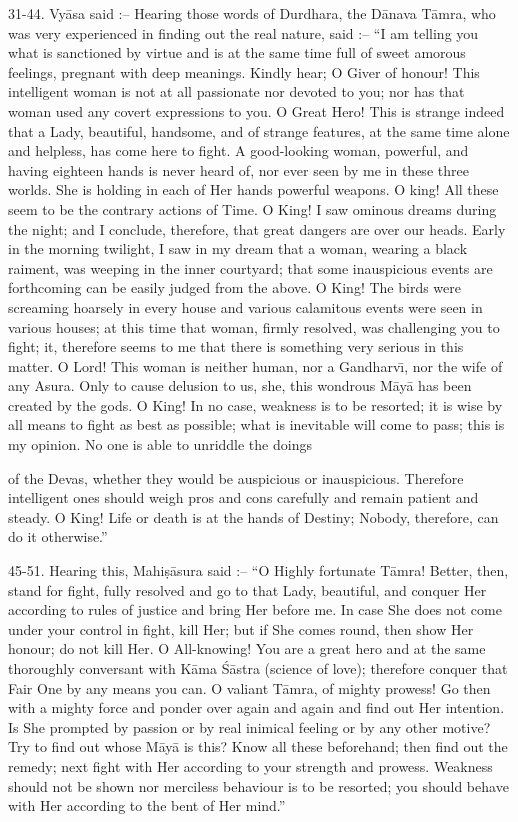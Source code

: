 31-44. Vy\=asa said :-- Hearing those words of Durdhara, the D\=anava T\=amra, who was very experienced in finding out the real nature, said :-- ``I am telling you what is sanctioned by virtue and is at the same time full of sweet amorous feelings, pregnant with deep meanings. Kindly hear; O Giver of honour! This intelligent woman is not at all passionate nor devoted to you; nor has that woman used any covert expressions to you. O Great Hero! This is strange indeed that a Lady, beautiful, handsome, and of strange features, at the same time alone and helpless, has come here to fight. A good-looking woman, powerful, and having eighteen hands is never heard of, nor ever seen by me in these three worlds. She is holding in each of Her hands powerful weapons. O king! All these seem to be the contrary actions of Time. O King! I saw ominous dreams during the night; and I conclude, therefore, that great dangers are over our heads. Early in the morning twilight, I saw in my dream that a woman, wearing a black raiment, was weeping in the inner courtyard; that some inauspicious events are forthcoming can be easily judged from the above. O King! The birds were screaming hoarsely in every house and various calamitous events were seen in various houses; at this time that woman, firmly resolved, was challenging you to fight; it, therefore seems to me that there is something very serious in this matter. O Lord! This woman is neither human, nor a Gandharv\={\i}, nor the wife of any Asura. Only to cause delusion to us, she, this wondrous M\=ay\=a has been created by the gods. O King! In no case, weakness is to be resorted; it is wise by all means to fight as best as possible; what is inevitable will come to pass; this is my opinion. No one is able to unriddle the doings

of the Devas, whether they would be auspicious or inauspicious. Therefore intelligent ones should weigh pros and cons carefully and remain patient and steady. O King! Life or death is at the hands of Destiny; Nobody, therefore, can do it otherwise.''

45-51. Hearing this, Mahi\d{s}\=asura said :-- ``O Highly fortunate T\=amra! Better, then, stand for fight, fully resolved and go to that Lady, beautiful, and conquer Her according to rules of justice and bring Her before me. In case She does not come under your control in fight, kill Her; but if She comes round, then show Her honour; do not kill Her. O All-knowing! You are a great hero and at the same thoroughly conversant with K\=ama \'S\=astra (science of love); therefore conquer that Fair One by any means you can. O valiant T\=amra, of mighty prowess! Go then with a mighty force and ponder over again and again and find out Her intention. Is She prompted by passion or by real inimical feeling or by any other motive? Try to find out whose M\=ay\=a is this? Know all these beforehand; then find out the remedy; next fight with Her according to your strength and prowess. Weakness should not be shown nor merciless behaviour is to be resorted; you should behave with Her according to the bent of Her mind.''

